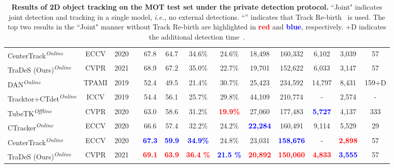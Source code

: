 \documentclass[final]{cvpr}
\begin{document}
\begin{table*}[!htb]
\begin{center}
\begin{tabular}{l|cc|c|ccccccccc}
			\rowcolor{mygray}
			\multicolumn{13}{c}{\emph{MOT17 Test Set}}\\
			\hline
			\hline
			CenterTrack\cite{CenterTrack}\textsuperscript{\emph{Online}} &ECCV&2020&\Checkmark& 67.8& 64.7 & 34.6\% & 24.6\% &18,498&160,332&6,102& 3,039 & 57\\
			TraDeS (Ours)\textsuperscript{\emph{Online}}&CVPR&2021&\Checkmark&68.9&67.2&35.0\%&22.7\%&19,701&152,622&6,033&3,147&57 \\
			\hline
			DAN\cite{sun2019deep}\textsuperscript{\emph{Online}} &TPAMI&2019&& 52.4 & 49.5 & 21.4\% & 30.7\% &25,423&234,592&14,797& 8,431 & 159+D\\
			Tracktor+CTdet\cite{tracktor}\textsuperscript{\emph{Online}}&ICCV&2019&&54.4&56.1&25.7\%&29.8\%&44,109&210,774&-&2,574&- \\
			\hline
			TubeTK\cite{tubetk}\textsuperscript{\emph{Offline}}&CVPR&2020 &\Checkmark& 63.0 & 58.6 & 31.2\% & \textcolor{red}{\bf19.9\%} &27,060&177,483&\textcolor{blue}{\bf 5,727}& 4,137 & 333\\
			CTracker\cite{CTacker}\textsuperscript{\emph{Online}}&ECCV&2020&\Checkmark& 66.6 & 57.4 & 32.2\% & 24.2\% &\textcolor{blue}{\bf 22,284}&160,491&9,114& 5,529 & 29\\
			CenterTrack\cite{CenterTrack}\textsuperscript{\emph{Online}}&ECCV&2020 &\Checkmark& \textcolor{blue}{\bf67.3} & \textcolor{blue}{\bf59.9} & \textcolor{blue}{\bf34.9\%} & 24.8\% &23,031&\textcolor{blue}{\bf158,676}&-& \textcolor{red}{\bf 2,898} & 57\\
			TraDeS (Ours)\textsuperscript{\emph{Online}} &CVPR&2021&\Checkmark& \textcolor{red}{\bf 69.1} & \textcolor{red}{\bf 63.9} & \textcolor{red}{\bf 36.4 \%} & \textcolor{blue}{\bf 21.5 \%} &\textcolor{red}{\bf 20,892}&\textcolor{red}{\bf 150,060}&\textcolor{red}{\bf 4,833}& \textcolor{blue}{\bf 3,555} & 57\\
			\hline
		\end{tabular}
	\end{center}
\vspace{-3mm}
\caption{\textbf{Results of 2D object tracking on the MOT test set under the private detection protocol.} ``Joint" indicates joint detection and tracking in a single model, \emph{i.e.,} no external detections. ``'' indicates that Track Re-birth~\cite{CenterTrack} is used. The top two results in the ``Joint" manner without Track Re-birth are highlighted in \textcolor{red}{\bf red} and \textcolor{blue}{\bf blue}, respectively. +D indicates the additional detection time~\cite{ren2015faster}.}
\label{tab:mot_sota}
\vspace{-3mm}
\end{table*}
\end{document}
